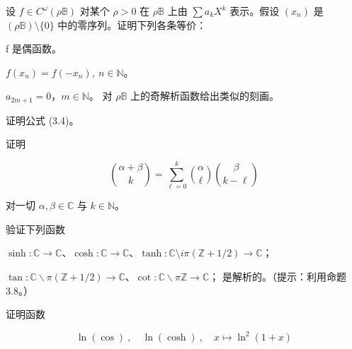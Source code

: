 \begin{exercises}
\item[6.]

设 $ f \in C^\omega(\rho\mathbb{B}) $ 对某个 $ \rho > 0 $ 在 $ \rho\mathbb{B} $ 上由 $ \sum a_k X^k $ 表示。假设 $ (x_n) $ 是 $ (\rho\mathbb{B})\setminus\{0\} $ 中的零序列。证明下列各条等价：

\begin{subitems}
\item

f 是偶函数。

\item

$ f(x_n) = f(-x_n), \ n \in \mathbb{N} $。

\item

$ a_{2m+1}=0 $，$ m\in\mathbb{N} $。
对 $ \rho\mathbb{B} $ 上的奇解析函数给出类似的刻画。

\end{subitems}

\item[7.]

证明公式 (3.4)。

\item[8.]

证明

\[
\binom{\alpha+\beta}{k}=\sum_{\ell=0}^{k}\binom{\alpha}{\ell}\binom{\beta}{k-\ell}
\]

对一切 $ \alpha, \beta \in \mathbb{C} $ 与 $ k \in \mathbb{N} $。

\item[9.]

验证下列函数

\begin{items}
\item

$ \sinh: \mathbb{C} \to \mathbb{C} $、$ \cosh: \mathbb{C} \to \mathbb{C} $、$ \tanh: \mathbb{C} \setminus i\pi(\mathbb{Z} + 1/2) \to \mathbb{C} $；

\item

$ \tan: \mathbb{C} \backslash \pi(\mathbb{Z} + 1/2) \to \mathbb{C} $、$ \cot: \mathbb{C} \backslash \pi\mathbb{Z} \to \mathbb{C} $；
是解析的。（提示：利用命题 3.8。）

\end{items}

\item[10.]

证明函数

\[
\ln(\cos)\ ,\quad\ln(\cosh)\ ,\quad x\mapsto\ln^{2}(1+x)
\]


\end{exercises}
